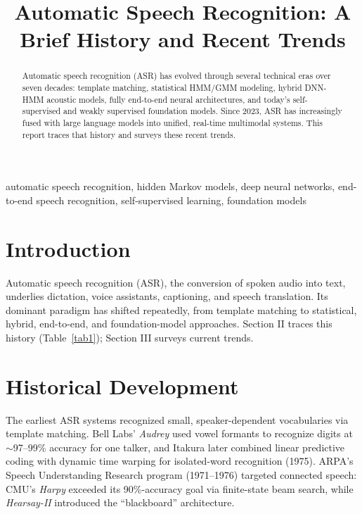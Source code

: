 \documentclass[conference]{IEEEtran}
\begin{document}
\title{Automatic Speech Recognition: A Brief History and Recent Trends}

\author{
}

\maketitle

\begin{abstract}
Automatic speech recognition (ASR) has evolved through several technical eras over seven decades: template matching, statistical HMM/GMM modeling, hybrid DNN-HMM acoustic models, fully end-to-end neural architectures, and today's self-supervised and weakly supervised foundation models. Since 2023, ASR has increasingly fused with large language models into unified, real-time multimodal systems. This report traces that history and surveys these recent trends.
\end{abstract}

\begin{IEEEkeywords}
automatic speech recognition, hidden Markov models, deep neural networks, end-to-end speech recognition, self-supervised learning, foundation models
\end{IEEEkeywords}

\section{Introduction}
Automatic speech recognition (ASR), the conversion of spoken audio into text, underlies dictation, voice assistants, captioning, and speech translation. Its dominant paradigm has shifted repeatedly, from template matching to statistical, hybrid, end-to-end, and foundation-model approaches. Section II traces this history (Table~\ref{tab1}); Section III surveys current trends.

\section{Historical Development}
The earliest ASR systems recognized small, speaker-dependent vocabularies via template matching. Bell Labs' \emph{Audrey} \cite{b1} used vowel formants to recognize digits at $\sim$97--99\% accuracy for one talker, and Itakura later combined linear predictive coding with dynamic time warping for isolated-word recognition (1975). ARPA's Speech Understanding Research program (1971--1976) targeted connected speech: CMU's \emph{Harpy} exceeded its 90\%-accuracy goal via finite-state beam search, while \emph{Hearsay-II} introduced the ``blackboard'' architecture.
\end{document}
